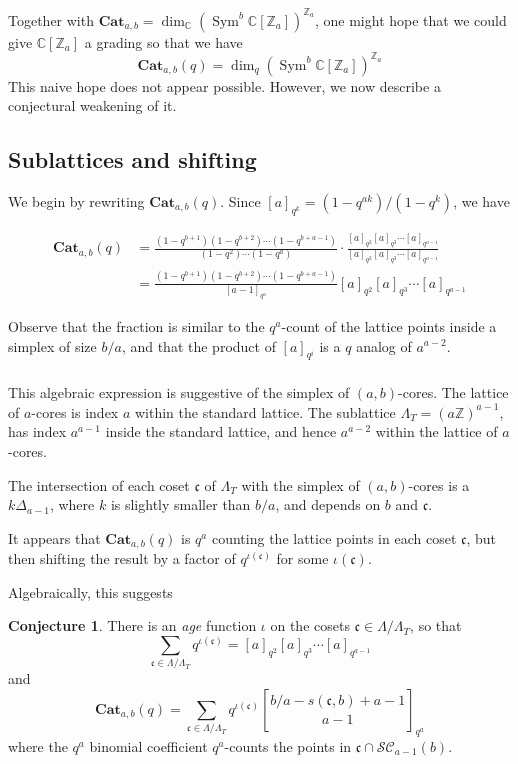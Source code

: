 \documentclass{amsart}[12pt]
\theoremstyle{definition}
\newtheorem{conjecture}[dummy]{Conjecture}
\newcommand{\Z}{\mathbb{Z}}
\newcommand{\C}{\mathbb{C}}
\newcommand{\Cat}{\mathbf{Cat}}
\DeclareMathOperator{\Sym}{Sym}
\begin{document}
Together with $\Cat_{a,b}=\dim_\C(\Sym^b\C[\Z_a])^{\Z_a}$, one
might hope that we could give $\C[\Z_a]$ a grading so that we have
$$\Cat_{a,b}(q)=\dim_q(\Sym^b \C[\Z_a])^{\Z_a}$$
This naive hope does not appear possible.  However, we now describe a
conjectural weakening of it.

\subsection{Sublattices and shifting}

We begin by rewriting $\Cat_{a,b}(q)$.  Since $[a]_{q^k}=(1-q^{ak})/(1-q^k)$, we have

\begin{align*}
\Cat_{a,b}(q)&=\frac{(1-q^{b+1})(1-q^{b+2})\cdots (1-q^{b+a-1})}{(1-q^2)\cdots(1-q^a)} \cdot \frac{[a]_{q^2}[a]_{q^3}\cdots[a]_{q^{a-1}}}{[a]_{q^2}[a]_{q^3}\cdots[a]_{q^{a-1}}} \\
&=\frac{(1-q^{b+1})(1-q^{b+2})\cdots (1-q^{b+a-1})}{[a-1]_{q^a}}[a]_{q^2}[a]_{q^3}\cdots[a]_{q^{a-1}}
\end{align*}

Observe that the fraction is similar to the $q^a$-count of the lattice
points inside a simplex of size $b/a$, and that the product of $[a]_{q^i}$ is a $q$ analog of $a^{a-2}$.

\subsubsection{}
This algebraic expression is suggestive of the simplex of
$(a,b)$-cores.  The lattice of $a$-cores is index $a$ within
the standard lattice.  The sublattice $\Lambda_T=(a\Z)^{a-1}$, has index $a^{a-1}$ inside the standard lattice, and hence $a^{a-2}$ within the lattice of $a$-cores.

The intersection of each coset $\mathfrak{c}$ of $\Lambda_T$ with the simplex of
$(a,b)$-cores is a $k\Delta_{a-1}$, where $k$ is slightly smaller than $b/a$, and depends on $b$ and $\mathfrak{c}$.


It appears that
$\Cat_{a,b}(q)$ is $q^a$ counting the lattice points in each coset $\mathfrak{c}$,
but then shifting the result by a factor of $q^{\iota(\mathfrak{c})}$ for some $\iota(\mathfrak{c})$.

Algebraically, this suggests
\begin{conjecture} \label{conj:cosets}
There is an \emph{age} function $\iota$ on the cosets $\mathfrak{c}\in\Lambda/\Lambda_T$, so that
$$\sum_{\mathfrak{c}\in\Lambda/\Lambda_T} q^{\iota(\mathfrak{c})}=[a]_{q^2}[a]_{q^3}\cdots[a]_{q^{a-1}}$$
 and
$$\Cat_{a,b}(q)=\sum_{\mathfrak{c}\in\Lambda/\Lambda_T} q^{\iota(\mathfrak{c})} {b/a-s(\mathfrak{c},b)+a-1\brack a-1}_{q^a}$$
where the $q^a$ binomial coefficient $q^a$-counts the points in $\mathfrak{c}\cap \mathcal{SC}_{a-1}(b)$.
\end{conjecture}
\end{document}

